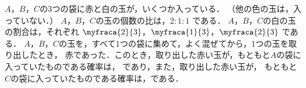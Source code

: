 \documentclass[../../../../uem_mei_q.tex]{subfiles}
\begin{document}
    $A$，$B$，$C$の3つの袋に赤と白の玉が，いくつか入っている．%
    （他の色の玉は，入っていない．）%
    $A$，$B$，$C$の玉の個数の比は，$2:1:1$ である．%
    $A$，$B$，$C$の白の玉の割合は，それぞれ %
    $\myfraca{2}{3}$，$\myfraca{1}{3}$，$\myfraca{2}{3}$ である．%
    $A$，$B$，$C$の玉を，すべて1つの袋に集めて，よく混ぜてから，1つの玉を取り出したとき，%
    赤であった．このとき，取り出した赤い玉が，もともと$A$の袋に入っていたものである確率は，%
    \:であり，また，取り出した赤い玉が，%
    もともと$C$の袋に入っていたものである確率は，\:である．
\end{document}
